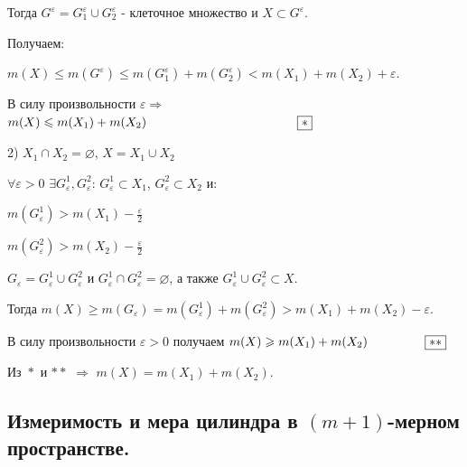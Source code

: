 \documentclass[a4paper,12pt]{article} %
\begin{document}
	\vspace{2mm}
	
	Тогда $G^{\varepsilon} = G_1^{\varepsilon} \cup G_2^{\varepsilon}$ - клеточное множество и $X \subset G^{\varepsilon}$.
	
	Получаем:
	
	$m(X) \leqslant m(G^{\varepsilon}) \leqslant m(G_1^{\varepsilon}) + m(G_2^{\varepsilon}) < m(X_1) + m(X_2) + \varepsilon$.
	
	\vspace{2mm}
	
	В силу произвольности $\varepsilon \Rightarrow$ $m(X) \leqslant m(X_1) + m(X_2) \hspace{42mm} \boxed{*}$
	
	\vspace{5mm}
	2) $X_1 \cap X_2 = \varnothing$, $X = X_1 \cup X_2$
	
	$\forall \varepsilon > 0$ $\exists G_{\varepsilon}^1, G_{\varepsilon}^2$: $G_{\varepsilon}^1 \subset X_1$, $G_{\varepsilon}^2 \subset X_2$ и:
	
	$m(G_{\varepsilon}^1) > m(X_1) - \frac{\varepsilon}{2}$
	
	$m(G_{\varepsilon}^2) > m(X_2) - \frac{\varepsilon}{2}$
	
	\vspace{2mm}
	
	$G_{\varepsilon} = G_{\varepsilon}^1 \cup G_{\varepsilon}^2$ и $G_{\varepsilon}^1 \cap G_{\varepsilon}^2 = \varnothing$, а также $G_{\varepsilon}^1 \cup G_{\varepsilon}^2 \subset X$.
	
	\vspace{2mm}
	
	Тогда $m(X) \geqslant m(G_{\varepsilon}) = m(G_{\varepsilon}^1) + m(G_{\varepsilon}^2) > m(X_1) + m(X_2) - \varepsilon$.
	
	\vspace{2mm}
	
	В силу произвольности $\varepsilon > 0$ получаем $m(X) \geqslant m(X_1) + m(X_2) \hspace{16mm} \boxed{**}$ 
	
	\vspace{2mm}
	
	Из $\boxed{*}$ и $\boxed{**}$ $\Rightarrow$ $m(X) = m(X_1) + m(X_2)$.\\
	
	\subsection{Измеримость и мера цилиндра в $(m+1)$-мерном пространстве.}
	
\end{document}
